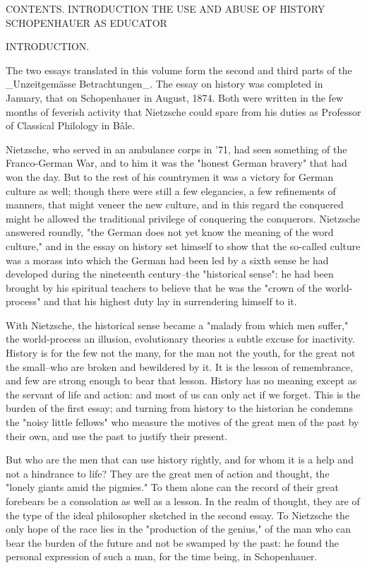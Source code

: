 CONTENTS.
INTRODUCTION
THE USE AND ABUSE OF HISTORY
SCHOPENHAUER AS EDUCATOR




INTRODUCTION.


The two essays translated in this volume form the second and third
parts of the _Unzeitgemässe Betrachtungen_. The essay on history was
completed in January, that on Schopenhauer in August, 1874. Both were
written in the few months of feverish activity that Nietzsche could
spare from his duties as Professor of Classical Philology in Bâle.

Nietzsche, who served in an ambulance corps in '71, had seen
something of the Franco-German War, and to him it was the "honest
German bravery" that had won the day. But to the rest of his
countrymen it was a victory for German culture as well; though there
were still a few elegancies, a few refinements of manners, that might
veneer the new culture, and in this regard the conquered might be
allowed the traditional privilege of conquering the conquerors.
Nietzsche answered roundly, "the German does not yet know the meaning
of the word culture," and in the essay on history set himself to show
that the so-called culture was a morass into which the German had
been led by a sixth sense he had developed during the nineteenth
century--the "historical sense": he had been brought by his spiritual
teachers to believe that he was the "crown of the world-process" and
that his highest duty lay in surrendering himself to it.

With Nietzsche, the historical sense became a "malady from which men
suffer," the world-process an illusion, evolutionary theories a
subtle excuse for inactivity. History is for the few not the many,
for the man not the youth, for the great not the small--who are
broken and bewildered by it. It is the lesson of remembrance, and few
are strong enough to bear that lesson. History has no meaning except
as the servant of life and action: and most of us can only act if we
forget. This is the burden of the first essay; and turning from
history to the historian he condemns the "noisy little fellows" who
measure the motives of the great men of the past by their own, and
use the past to justify their present.

But who are the men that can use history rightly, and for whom it is
a help and not a hindrance to life? They are the great men of action
and thought, the "lonely giants amid the pigmies." To them alone can
the record of their great forebears be a consolation as well as a
lesson. In the realm of thought, they are of the type of the ideal
philosopher sketched in the second essay. To Nietzsche the only hope
of the race lies in the "production of the genius," of the man who
can bear the burden of the future and not be swamped by the past: he
found the personal expression of such a man, for the time being, in
Schopenhauer.


